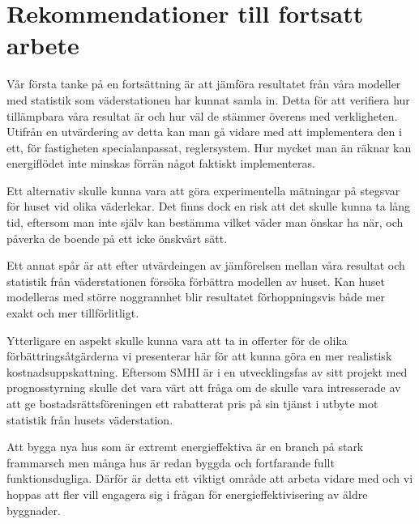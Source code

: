 \section{Rekommendationer till fortsatt arbete}

Vår första tanke på en fortsättning är att jämföra resultatet från våra modeller med 
statistik som väderstationen har kunnat samla in. Detta för att verifiera hur tillämpbara 
våra resultat är och hur väl de stämmer överens med verkligheten. Utifrån en utvärdering
 av detta kan man gå vidare med att implementera den i ett, för fastigheten 
 specialanpassat, reglersystem. Hur mycket man än räknar kan energiflödet inte minskas 
 förrän något faktiskt implementeras.

Ett alternativ skulle kunna vara att göra experimentella mätningar på stegsvar för huset
 vid olika väderlekar. Det finns dock en risk att det skulle kunna ta lång tid, eftersom man 
 inte själv kan bestämma vilket väder man önskar ha när, och påverka de boende på ett 
 icke önskvärt sätt.

Ett annat spår är att efter utvärdeingen av jämförelsen mellan våra resultat och statistik 
från väderstationen försöka förbättra modellen av huset. Kan huset modelleras med 
större noggrannhet blir resultatet förhoppningsvis både mer exakt och mer tillförlitligt. %

Ytterligare en aspekt skulle kunna vara att ta in offerter för de olika förbättringsåtgärderna vi presenterar här för att kunna göra en mer realistisk kostnadsuppskattning. Eftersom 
SMHI är i en utvecklingsfas av sitt projekt med prognosstyrning skulle det vara värt att
 fråga om de skulle vara intresserade av att ge bostadsrättsföreningen ett rabatterat pris 
 på sin tjänst i utbyte mot statistik från husets väderstation.

Att bygga nya hus som är extremt energieffektiva är en branch på stark frammarsch men
 många hus är redan byggda och fortfarande fullt funktionsdugliga. Därför är detta ett 
viktigt område att arbeta vidare med och vi hoppas att fler vill engagera sig i frågan för 
energieffektivisering av äldre byggnader.

